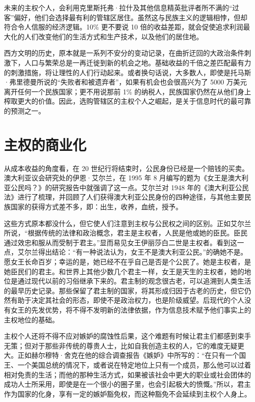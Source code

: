 未来的主权个人，会利用克里斯托弗·拉什及其他信息精英批评者所不满的“过客”偏好，他们会选择最有利的管辖区居住。虽然这与民族主义的逻辑相悖，但却符合令人信服的经济逻辑。10\% 更不要说 10 倍的收益差距，就会促使追求利润最大化的人们改变他们的生活方式和生产技术，以及他们的居住地。

西方文明的历史，原本就是一系列不安分的变动记录，在曲折迂回的大政治条件刺激下，人口与繁荣总是一再迁徙到新的机会之地。基础收益的千倍之差匹配最有力的刺激措施，将让理性的人们行动起来。或者换句话说，大多数人，即使是托马斯·弗里德曼所说的“失败者和被遗弃者”，如果有机会也会很高兴为了 5000 万美元离开任何一个民族国家；更不用说那前 1\% 的纳税人，民族国家仍然在从他们身上榨取更大的价值。因此，选购管辖区的主权个人之崛起，是关于信息时代的最可靠的预测之一。

\section{主权的商业化}
从成本收益的角度看，在 20 世纪行将结束时，公民身份已经是一个赔钱的买卖。澳大利亚议会研究处的伊恩·艾尔兰，在 1995 年 8 月编写的题为《女王是澳大利亚公民吗？》的研究报告中就强调了这一点。艾尔兰对 1948 年的《澳大利亚公民法》进行了梳理，并回顾了人们获得澳大利亚公民身份的四种途径，与其他主要民族国家的获得方式差不多，即：出生，收养，血统，授予。

这些方式原本都没什么，但它使人们注意到主权与公民权之间的区别。正如艾尔兰所说，“根据传统的法律和政治概念，君主是主权者，人民是他或她的臣民。臣民通过效忠和服从而受制于君主。”显而易见女王伊丽莎白二世是主权者。看到这一点，艾尔兰得出结论：“有一种说法认为，女王不是澳大利亚公民。”的确她不是。愿女王长命百岁；幸运的是，她已经不在乎自己是否是个公民了。她是主权者，是她臣民们的君主。和世界上其他少数几个君主一样，女王是天生的主权者，她的地位是通过现代以前的习俗继承下来的。君主制的观念很古老，可以追溯到人类生活的最早历史记录。那些保留了君主制的国家，将其形成归因于古老的历史，但它仍然有助于决定其社会的形态，即使不是政治权力，也是阶级威望。后现代的个人没有女王的先发优势，将不得不发明新的法律依据，作为信息技术赋予他们事实上的主权地位的基础。

主权个人还将不得不应对嫉妒的腐蚀性后果，这个难题有时候让君主们都感到束手无策；但对于那些非传统的尊贵人士，比如自我创造主权的人，它的难度无疑更大。正如赫尔穆特·舍克在他的综合调查报告《嫉妒》中所写的：“在只有一个国王、一个美国总统的情况下，或者说在特定地位上只有一个成员，那么他可以过着相对免责的生活；而他的那种生活方式，如果被该社会中更大的职业或社会团体的成功人士所采用，即使是在一个很小的圈子里，也会引起极大的愤慨。”所以，君主作为国家的化身，享有一定的嫉妒豁免权，而这种豁免不会延续到主权个人身上。

